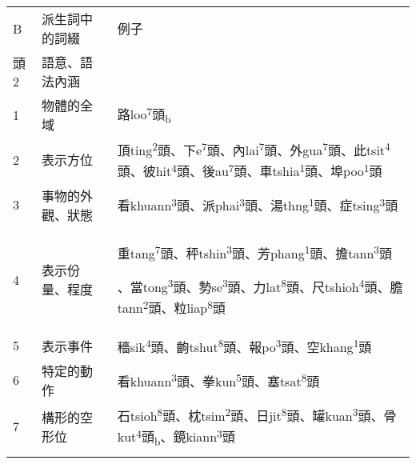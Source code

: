 \tabletail{}
\tablelasttail{}
\begin{tabularx}{\textwidth}{XXX}
\lsptoprule

B & {\sffamily \textrm{派生詞中的詞綴}} & 例子\\
\hhline{--~}
頭2 & \multicolumn{1}{X}{{\sffamily \textrm{語意、語法內涵}}} & \\
1 & 物體的全域 & {\sffamily \textrm{路loo}\textrm{\textsuperscript{7}}\textrm{頭}\textrm{\textsubscript{b}}}\\
2 & 表示方位 & {\sffamily \textrm{頂ting}\textrm{\textsuperscript{2}}\textrm{頭、下e}\textrm{\textsuperscript{7}}\textrm{頭、內lai}\textrm{\textsuperscript{7}}\textrm{頭、外gua}\textrm{\textsuperscript{7}}\textrm{頭、此tsit}\textrm{\textsuperscript{4}}\textrm{頭、彼hit}\textrm{\textsuperscript{4}}\textrm{頭、後au}\textrm{\textsuperscript{7}}\textrm{頭、車tshia}\textrm{\textsuperscript{1}}\textrm{頭、埠poo}\textrm{\textsuperscript{1}}\textrm{頭}}\\
3 & {\sffamily \textrm{事物的外觀、狀態}} & {\sffamily \textrm{看khuann}\textrm{\textsuperscript{3}}\textrm{頭、派phai}\textrm{\textsuperscript{3}}\textrm{頭、湯thng}\textrm{\textsuperscript{1}}\textrm{頭、症tsing}\textrm{\textsuperscript{3}}\textrm{頭}}\\
4 & {\sffamily \textrm{表示份量、程度}} & {\sffamily \textrm{重tang}\textrm{\textsuperscript{7}}\textrm{頭、秤tshin}\textrm{\textsuperscript{3}}\textrm{頭、芳phang}\textrm{\textsuperscript{1}}\textrm{頭、擔tann}\textrm{\textsuperscript{3}}\textrm{頭}}

{\sffamily 、\textrm{當tong}\textrm{\textsuperscript{3}}\textrm{頭、勢se}\textrm{\textsuperscript{3}}\textrm{頭、力lat}\textrm{\textsuperscript{8}}\textrm{頭、尺tshioh}\textrm{\textsuperscript{4}}\textrm{頭、膽tann}\textrm{\textsuperscript{2}}\textrm{頭、粒liap}\textrm{\textsuperscript{8}}\textrm{頭}}\\
5 & 表示事件 & {\sffamily \textrm{穡sik}\textrm{\textsuperscript{4}}\textrm{頭、齣tshut}\textrm{\textsuperscript{8}}\textrm{頭、報po}\textrm{\textsuperscript{3}}\textrm{頭、空khang}\textrm{\textsuperscript{1}}\textrm{頭}}\\
6 & 特定的動作 & {\sffamily \textrm{看khuann}\textrm{\textsuperscript{3}}\textrm{頭、拳kun}\textrm{\textsuperscript{5}}\textrm{頭、塞tsat}\textrm{\textsuperscript{8}}\textrm{頭}}\\
7 & 構形的空形位 & {\sffamily \textrm{石tsioh}\textrm{\textsuperscript{8}}\textrm{頭、枕tsim}\textrm{\textsuperscript{2}}\textrm{頭、日jit}\textrm{\textsuperscript{8}}\textrm{頭、罐kuan}\textrm{\textsuperscript{3}}\textrm{頭、骨kut}\textrm{\textsuperscript{4}}\textrm{頭}\textrm{\textsubscript{b}}\textrm{、鏡kiann}\textrm{\textsuperscript{3}}\textrm{頭}}\\
\lspbottomrule
\end{tabularx}
